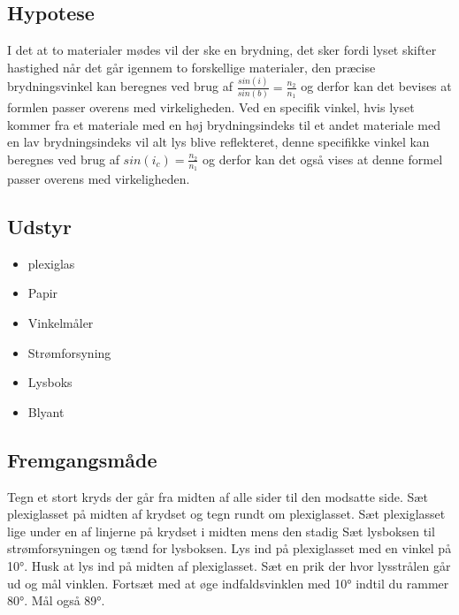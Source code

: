 \subsection{Hypotese}
I det at to materialer mødes vil der ske en brydning, det sker fordi lyset skifter hastighed når det går igennem to forskellige materialer, den præcise brydningsvinkel kan beregnes ved brug af \begin{math}\frac{sin(i)}{sin(b)} = \frac{n_{2}}{n_{1}}\end{math} og derfor kan det bevises at formlen passer overens med virkeligheden.\newline
Ved en specifik vinkel, hvis lyset kommer fra et materiale med en høj brydningsindeks til et andet materiale med en lav brydningsindeks vil alt lys blive reflekteret, denne specifikke vinkel kan beregnes ved brug af \begin{math}sin(i_{c}) = \frac{n_{2}}{n_{1}}\end{math} og derfor kan det også vises at denne formel passer overens med virkeligheden.

\subsection{Udstyr}
\begin{itemize}
    \item plexiglas
    \item Papir
    \item Vinkelmåler
    \item Strømforsyning
    \item Lysboks
    \item Blyant
\end{itemize}

\subsection{Fremgangsmåde}
Tegn et stort kryds der går fra midten af alle sider til den modsatte side. Sæt plexiglasset på midten af krydset og tegn rundt om plexiglasset. Sæt plexiglasset lige under en af linjerne på krydset i midten mens den stadig Sæt lysboksen til strømforsyningen og tænd for lysboksen. Lys ind på plexiglasset med en vinkel på 10°.  Husk at lys ind på midten af plexiglasset. Sæt en prik der hvor lysstrålen går ud og mål vinklen. Fortsæt med at øge indfaldsvinklen med 10° indtil du rammer 80°. Mål også 89°.

